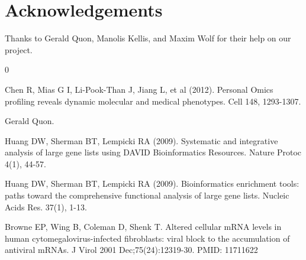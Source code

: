 \documentclass[aps,prd,final,onecolumn,a4paper,10pt]{revtex4}
\begin{document}
\section{Acknowledgements}
Thanks to Gerald Quon, Manolis Kellis, and Maxim Wolf for their help on our project.

\begin{thebibliography} {0}

 Chen R, Mias G I, Li-Pook-Than J, Jiang L, et al (2012). Personal Omics profiling reveals dynamic molecular and medical phenotypes. Cell 148, 1293-1307.

 Gerald Quon.

 Huang DW, Sherman BT, Lempicki RA (2009). Systematic and integrative analysis of large gene lists using DAVID Bioinformatics Resources. Nature Protoc 4(1), 44-57.

 Huang DW, Sherman BT, Lempicki RA (2009). Bioinformatics enrichment tools: paths toward the comprehensive functional analysis of large gene lists. Nucleic Acids Res. 37(1), 1-13.

 Browne EP, Wing B, Coleman D, Shenk T. Altered cellular mRNA levels in human cytomegalovirus-infected fibroblasts: viral block to the accumulation of antiviral mRNAs. J Virol 2001 Dec;75(24):12319-30. PMID: 11711622


\end{thebibliography}
\end{document}
